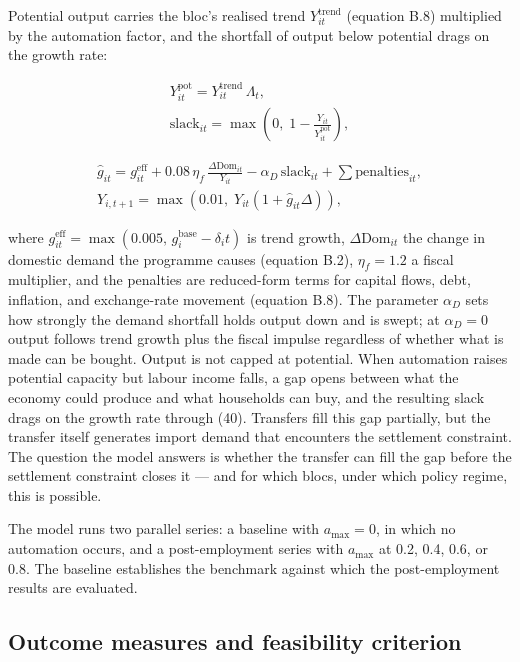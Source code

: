 \documentclass[preprint,review,12pt]{elsarticle}
\begin{document}
Potential output carries the bloc's realised trend
\(Y^{\mathrm{trend}}_{it}\) (equation B.8) multiplied by the automation
factor, and the shortfall of output below potential drags on the growth
rate:

\[\begin{gathered} Y^{\mathrm{pot}}_{it} = Y^{\mathrm{trend}}_{it} \, \Lambda_t, \\ \mathrm{slack}_{it} = \max\left( 0,\; 1 - \frac{Y_{it}}{Y^{\mathrm{pot}}_{it}} \right), \end{gathered} \tag{39}\]

\[\begin{gathered} \hat{g}_{it} = g^{\mathrm{eff}}_{it} + 0.08 \, \eta_f \, \frac{\Delta \mathrm{Dom}_{it}}{Y_{it}} - \alpha_D \, \mathrm{slack}_{it} + \textstyle\sum \mathrm{penalties}_{it}, \\ Y_{i,t+1} = \max\left( 0.01,\; Y_{it} \left( 1 + \hat{g}_{it} \Delta \right) \right), \end{gathered} \tag{40}\]

where
\(g^{\mathrm{eff}}_{it} = \max(0.005,\, g^{\mathrm{base}}_i - \delta_i t)\)
is trend growth, \(\Delta \mathrm{Dom}_{it}\) the change in domestic
demand the programme causes (equation B.2), \(\eta_f = 1.2\) a fiscal
multiplier, and the penalties are reduced-form terms for capital flows,
debt, inflation, and exchange-rate movement (equation B.8). The
parameter \(\alpha_D\) sets how strongly the demand shortfall holds
output down and is swept; at \(\alpha_D = 0\) output follows trend
growth plus the fiscal impulse regardless of whether what is made can be
bought. Output is not capped at potential. When automation raises
potential capacity but labour income falls, a gap opens between what the
economy could produce and what households can buy, and the resulting
slack drags on the growth rate through (40). Transfers fill this gap
partially, but the transfer itself generates import demand that
encounters the settlement constraint. The question the model answers is
whether the transfer can fill the gap before the settlement constraint
closes it --- and for which blocs, under which policy regime, this is
possible.

The model runs two parallel series: a baseline with \(a_{\max} = 0\), in
which no automation occurs, and a post-employment series with
\(a_{\max}\) at 0.2, 0.4, 0.6, or 0.8. The baseline establishes the
benchmark against which the post-employment results are evaluated.

\subsection{Outcome measures and feasibility criterion}
\end{document}
